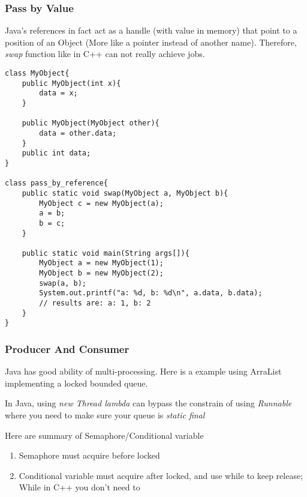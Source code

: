 \subsubsection{Pass by Value}

Java's references in fact act as a handle (with value in memory) that point to a position of an Object (More like a pointer instead of another name). Therefore, \textit{swap} function like in C++ can not really achieve jobs.

\begin{lstlisting}
class MyObject{
    public MyObject(int x){
        data = x;
    }

    public MyObject(MyObject other){
        data = other.data;
    }
    public int data;
}

class pass_by_reference{
    public static void swap(MyObject a, MyObject b){
        MyObject c = new MyObject(a);
        a = b;
        b = c;
    }

    public static void main(String args[]){
        MyObject a = new MyObject(1);
        MyObject b = new MyObject(2);
        swap(a, b);
        System.out.printf("a: %d, b: %d\n", a.data, b.data);
        // results are: a: 1, b: 2
    }
}
\end{lstlisting}

\subsubsection{Producer And Consumer}
Java has good ability of multi-processing. Here is a example using ArraList implementing a locked bounded queue.

In Java, {\color{blue} using \textit{new Thread lambda} can bypass the constrain of using \textit{Runnable} where you need to make sure your queue is \textit{static final}}

Here are summary of Semaphore/Conditional variable
\begin{enumerate}
\item Semaphore must acquire before locked
\item Conditional variable must acquire after locked, and use while to keep release; While in C++ you don't need to
\end{enumerate}

